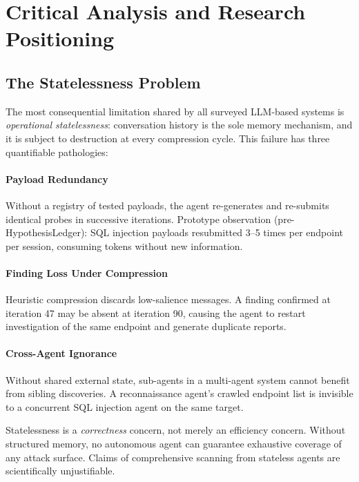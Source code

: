\documentclass[12pt,a4paper,oneside,openany]{book}
\newcommand{\term}[1]{\textit{#1}}
\begin{document}
\chapter{Critical Analysis and Research Positioning}

\section{The Statelessness Problem}

The most consequential limitation shared by all surveyed LLM-based systems is \term{operational statelessness}: conversation history is the sole memory mechanism, and it is subject to destruction at every compression cycle. This failure has three quantifiable pathologies:

\subsubsection{Payload Redundancy}
Without a registry of tested payloads, the agent re-generates and re-submits identical probes in successive iterations. Prototype observation (pre-HypothesisLedger): SQL injection payloads resubmitted 3--5 times per endpoint per session, consuming tokens without new information.

\subsubsection{Finding Loss Under Compression}
Heuristic compression discards low-salience messages. A finding confirmed at iteration 47 may be absent at iteration 90, causing the agent to restart investigation of the same endpoint and generate duplicate reports.

\subsubsection{Cross-Agent Ignorance}
Without shared external state, sub-agents in a multi-agent system cannot benefit from sibling discoveries. A reconnaissance agent's crawled endpoint list is invisible to a concurrent SQL injection agent on the same target.

\begin{warningbox}
Statelessness is a \textit{correctness} concern, not merely an efficiency concern. Without structured memory, no autonomous agent can guarantee exhaustive coverage of any attack surface. Claims of comprehensive scanning from stateless agents are scientifically unjustifiable.
\end{warningbox}
\end{document}
